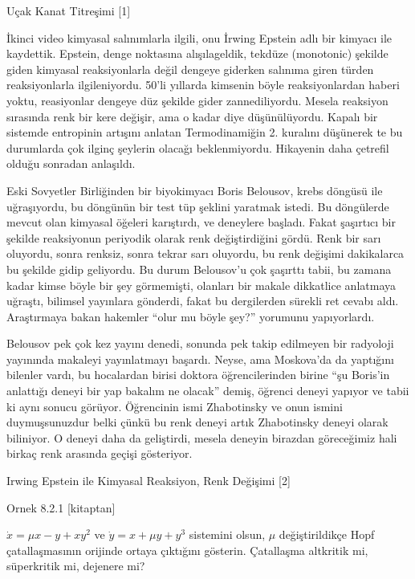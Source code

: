 \documentclass[12pt,fleqn]{article}\usepackage{../../common}
\begin{document}
Uçak Kanat Titreşimi [1]

İkinci video kimyasal salınımlarla ilgili, onu İrwing Epstein adlı bir
kimyacı ile kaydettik. Epstein, denge noktasına alışılageldik, tekdüze
(monotonic) şekilde giden kimyasal reaksiyonlarla değil dengeye giderken
salınıma giren türden reaksiyonlarla ilgileniyordu. 50'li yıllarda kimsenin
böyle reaksiyonlardan haberi yoktu, reasiyonlar dengeye düz şekilde gider
zannediliyordu. Mesela reaksiyon sırasında renk bir kere değişir, ama o
kadar diye düşünülüyordu. Kapalı bir sistemde entropinin artışını anlatan
Termodinamiğin 2. kuralını düşünerek te bu durumlarda çok ilginç şeylerin
olacağı beklenmiyordu. Hikayenin daha çetrefil olduğu sonradan anlaşıldı.

Eski Sovyetler Birliğinden bir biyokimyacı Boris Belousov, krebs döngüsü ile
uğraşıyordu, bu döngünün bir test tüp şeklini yaratmak istedi. Bu döngülerde
mevcut olan kimyasal öğeleri karıştırdı, ve deneylere başladı. Fakat şaşırtıcı
bir şekilde reaksiyonun periyodik olarak renk değiştirdiğini gördü. Renk bir
sarı oluyordu, sonra renksiz, sonra tekrar sarı oluyordu, bu renk değişimi
dakikalarca bu şekilde gidip geliyordu. Bu durum Belousov'u çok şaşırttı tabii,
bu zamana kadar kimse böyle bir şey görmemişti, olanları bir makale dikkatlice
anlatmaya uğraştı, bilimsel yayınlara gönderdi, fakat bu dergilerden sürekli ret
cevabı aldı. Araştırmaya bakan hakemler ``olur mu böyle şey?'' yorumunu
yapıyorlardı.

Belousov pek çok kez yayını denedi, sonunda pek takip edilmeyen bir radyoloji
yayınında makaleyi yayınlatmayı başardı. Neyse, ama Moskova'da da yaptığını
bilenler vardı, bu hocalardan birisi doktora öğrencilerinden birine ``şu
Boris'in anlattığı deneyi bir yap bakalım ne olacak'' demiş, öğrenci deneyi
yapıyor ve tabii ki aynı sonucu görüyor. Öğrencinin ismi Zhabotinsky ve onun
ismini duymuşsunuzdur belki çünkü bu renk deneyi artık Zhabotinsky deneyi olarak
biliniyor. O deneyi daha da geliştirdi, mesela deneyin birazdan göreceğimiz hali
birkaç renk arasında geçişi gösteriyor.

Irwing Epstein ile Kimyasal Reaksiyon, Renk Değişimi [2]

Ornek 8.2.1 [kitaptan]

$\dot{x} = \mu x - y + xy^2$ ve $\dot{y} = x + \mu y + y^3$ sistemini
olsun, $\mu$ değiştirildikçe Hopf çatallaşmasının orijinde ortaya çıktığını
gösterin. Çatallaşma altkritik mi, süperkritik mi, dejenere mi?

\inputminted[fontsize=\footnotesize]{python}{ex8.2.1.py}
\end{document}
